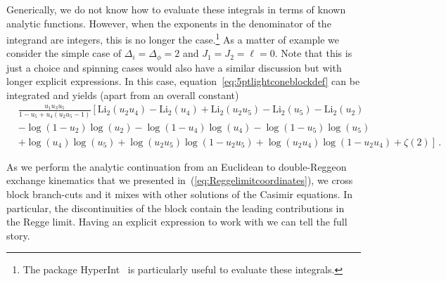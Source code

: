 Generically, we do not know how to evaluate these integrals in terms of known analytic functions.
However, when the exponents in the denominator of the integrand are integers, this is no longer the case.\footnote{The package HyperInt~\cite{Panzer:2014caa} is particularly useful to evaluate these integrals.} As a matter of example we consider the simple case of $\Delta_i=\Delta_\phi=2$ and $J_1=J_2=\ell=0$. Note that this is just a choice and spinning cases would also have a similar discussion but with longer explicit expressions. In this case, equation~\eqref{eq:5ptlightconeblockdef} can be integrated and yields (apart from an overall constant)
\begin{align}
  \label{eq:simplecase}
   & \frac{u_1 u_3 u_5}{1-u_5+u_4 \left(u_2 u_5-1\right)}
  \left[\text{Li}_2\left(u_2 u_4\right)-\text{Li}_2\left(u_4\right)+\text{Li}_2\left(u_2 u_5\right)-\text{Li}_2\left(u_5\right)-\text{Li}_2\left(u_2\right)\right.    \\
   & \left.-\log \left(1-u_2\right) \log \left(u_2\right)-\log \left(1-u_4\right) \log \left(u_4\right)-\log \left(1-u_5\right) \log \left(u_5\right)\right.\nonumber \\
   & \left.+\log \left(u_4\right)
    \log \left(u_5\right)+\log
    \left(u_2 u_5\right) \log \left(1-u_2 u_5\right)+\log
    \left(u_2 u_4\right)\log \left(1-u_2 u_4\right)+\zeta(2)\right]\nonumber\,.
\end{align}

As we perform the analytic continuation from an Euclidean to double-Reggeon exchange kinematics that we presented in~(\ref{eq:Reggelimitcoordinates}), we cross block branch-cuts and it mixes with other solutions of the Casimir equations. In particular, the discontinuities of the block contain the leading contributions in the Regge limit. Having an explicit expression to work with we can tell the full story.

